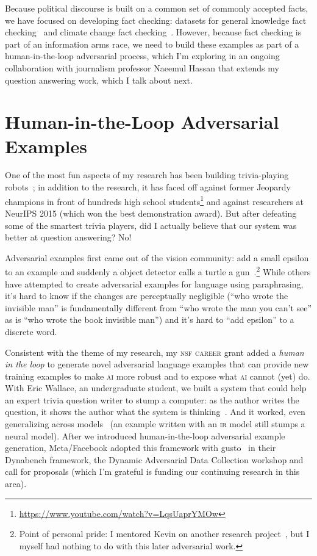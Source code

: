 \documentclass[11pt]{amsart}
\newcommand{\abr}[1]{\textsc{#1}}
\begin{document}
Because political discourse is built on a common set of commonly
accepted facts, we have focused on developing fact checking: datasets
for general knowledge fact checking~\cite{eisenschlos-21} and climate
change fact checking~\cite{Diggelmann-20}.
%
However, because fact checking is part of an information arms race, we
need to build these examples as part of a human-in-the-loop
adversarial process, which I'm exploring in an ongoing collaboration
with journalism professor Naeemul Hassan that extends my question
answering work, which I talk about next.

\section{Human-in-the-Loop Adversarial Examples}

One of the most fun aspects of my research has been building
trivia-playing robots~\cite{boyd-graber-12,iyyer-14b,iyyer-15}; in
addition to the research, it has faced off against former Jeopardy
champions in front of hundreds high school
students\footnote{\url{https://www.youtube.com/watch?v=LqsUaprYMOw}}
and against researchers at NeurIPS 2015 (which won the best
demonstration award).
%
But after defeating some of the smartest trivia players, did I
actually believe that our system was better at question answering?
%
No!

Adversarial examples first came out of the vision community: add a
small epsilon to an example and suddenly a object detector calls a
turtle a gun~\cite{athalye-18}.\footnote{Point of personal pride: I
mentored Kevin on another research project~\cite{he-16}, but
I myself had nothing to do with this later adversarial work.}
%
While others have attempted to create adversarial examples for
language using paraphrasing, it's hard to know if the changes are
perceptually negligible (``who wrote the invisible man'' is
fundamentally different from ``who wrote the man you can't see'' as is
``who wrote the book invisible man'') and
it's hard to ``add epsilon'' to a discrete word.

Consistent with the theme of my research, my \abr{nsf career} grant
added a \emph{human in the loop} to generate novel adversarial
language examples that can provide new training examples to make
\abr{ai} more robust and to expose what \abr{ai} cannot (yet) do.
%
With Eric Wallace, an undergraduate student, we built a system that
could help an expert trivia question writer to stump a computer: as
the author writes the question, it shows the author what the system is
thinking~\cite{wallace-18}.
%
And it worked, even generalizing across models~\cite{wallace-19} (an
example written with an \abr{ir} model still stumps a neural model).
%
After we introduced human-in-the-loop adversarial example generation,
Meta/Facebook adopted this framework with gusto~\cite{bartolo-20} in
their Dynabench framework, the Dynamic Adversarial Data Collection
workshop and call for proposals (which I'm grateful is funding our
continuing research in this area).
\end{document}
